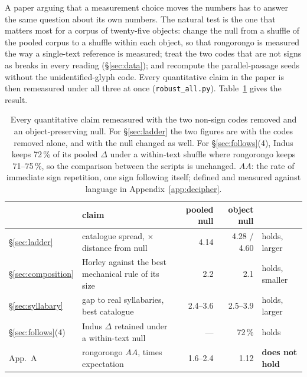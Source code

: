 \documentclass[11pt,a4paper]{article}
\begin{document}
A paper arguing that a measurement choice moves the numbers has to answer the same question about its own numbers. The natural test is the one that matters most for a corpus of twenty-five objects: change the null from a shuffle of the pooled corpus to a shuffle within each object, so that rongorongo is measured the way a single-text reference is measured; treat the two codes that are not signs as breaks in every reading (\S\ref{sec:data}); and recompute the parallel-passage seeds without the unidentified-glyph code. Every quantitative claim in the paper is then remeasured under all three at once (\texttt{robust\_all.py}). Table~\ref{tab:robust} gives the result.

\begin{table}[t]
\centering\small
\begin{tabular}{l l r r l}
\toprule
 & claim & pooled null & object null & \\
\midrule
\S\ref{sec:ladder} & catalogue spread, $\times$ distance from null & 4.14 & 4.28 / 4.60 & holds, larger \\
\S\ref{sec:composition} & Horley against the best mechanical rule of its size & 2.2 & 2.1 & holds, smaller \\
\S\ref{sec:syllabary} & gap to real syllabaries, best catalogue & 2.4--3.6 & 2.5--3.9 & holds, larger \\
\S\ref{sec:follows}(4) & Indus $\Delta$ retained under a within-text null & --- & 72\,\% & holds \\
App.~A & rongorongo $AA$, times expectation & 1.6--2.4 & 1.12 & \textbf{does not hold} \\
\bottomrule
\end{tabular}
\caption{Every quantitative claim remeasured with the two non-sign codes removed and an object-preserving null. For \S\ref{sec:ladder} the two figures are with the codes removed alone, and with the null changed as well. For \S\ref{sec:follows}(4), Indus keeps 72\,\% of its pooled $\Delta$ under a within-text shuffle where rongorongo keeps 71--75\,\%, so the comparison between the scripts is unchanged. $AA$: the rate of immediate sign repetition, one sign following itself; defined and measured against language in Appendix~\ref{app:decipher}.}
\label{tab:robust}
\end{table}
\end{document}
